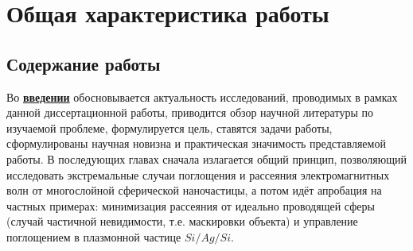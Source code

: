 \section*{Общая характеристика работы}

\newcommand{\actuality}{\underline{\textbf{\actualityTXT}}}
\newcommand{\progress}{\underline{\textbf{\progressTXT}}}
\newcommand{\aim}{\needspace{2\baselineskip}\underline{{\textbf\aimTXT}}}
\newcommand{\tasks}{\underline{\textbf{\tasksTXT}}}
\newcommand{\novelty}{\underline{\textbf{\noveltyTXT}}}
\newcommand{\influence}{\underline{\textbf{\influenceTXT}}}
\newcommand{\methods}{\underline{\textbf{\methodsTXT}}}
\newcommand{\defpositions}{\needspace{2\baselineskip}\underline{\textbf{\defpositionsTXT}}}
\newcommand{\reliability}{\underline{\textbf{\reliabilityTXT}}}
\newcommand{\probation}{\underline{\textbf{\probationTXT}}}
\newcommand{\contribution}{\underline{\textbf{\contributionTXT}}}
\newcommand{\publications}{\underline{\textbf{\publicationsTXT}}}




\subsection*{Содержание работы}
Во \underline{\textbf{введении}} обосновывается актуальность
исследований, проводимых в рамках данной диссертационной работы,
приводится обзор научной литературы по изучаемой проблеме,
формулируется цель, ставятся задачи работы, сформулированы научная
новизна и практическая значимость представляемой работы. В последующих
главах сначала излагается общий принцип, позволяющий исследовать
экстремальные случаи поглощения и рассеяния электромагнитных волн от
многослойной сферической наночастицы, а потом идёт апробация на
частных примерах: минимизация рассеяния от идеально проводящей сферы
(случай частичной невидимости, т.е. маскировки объекта) и управление
поглощением в плазмонной частице $Si/Ag/Si$.


